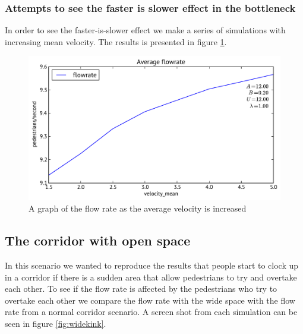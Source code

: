 \subsubsection{Attempts to see the faster is slower effect in the bottleneck}
In order to see the faster-is-slower effect we make a series of simulations 
with increasing mean velocity. The results is presented in figure 
\ref{fig:is-faster-slower-in-bottleneck}.

\begin{figure}[h]
\centering
\includegraphics[scale=0.45]{Figures/Wide-kink-one-directional-flowrate-agg.pdf}
\caption{A graph of the flow rate as the average velocity is increased}
\label{fig:is-faster-slower-in-bottleneck}
\end{figure}

\subsection{The corridor with open space}
In this scenario we wanted to reproduce the results that people start to 
clock up in a corridor if there is a sudden area that allow pedestrians to try 
and overtake each other. To see if the flow rate is affected by the pedestrians 
who try to overtake each other we compare the flow rate with the wide space with 
the flow rate from a normal corridor scenario. A screen shot from each simulation 
can be seen in figure \ref{fig:widekink}.

